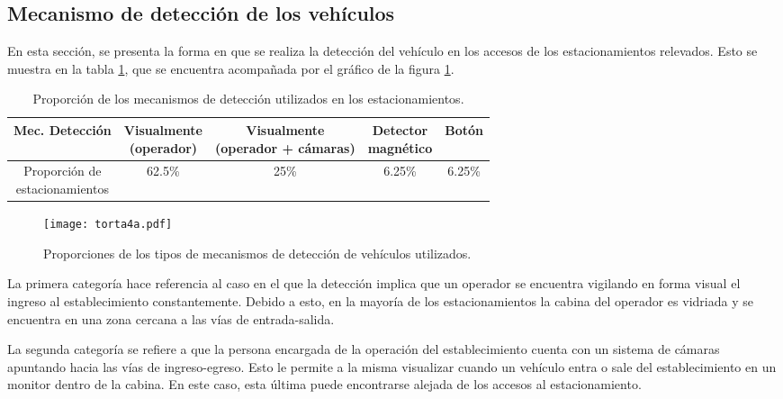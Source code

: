 \subsection{Mecanismo de detección de los vehículos}
En esta sección, se presenta la forma en que se realiza la detección del vehículo en los accesos de los estacionamientos relevados. Esto se muestra en la tabla \ref{tabla:est_dec_det}, que se encuentra acompañada por el gráfico de la figura \ref{fig:img_torta4a}.

\begin{table}[h]
	\begin{center}
		\resizebox{14cm}{!} {
			\begin{tabular}{|c|c|c|c|c|} 
				\hline
				Mec. Detección & \parbox{3cm}{\centering Visualmente \\ (operador)} & \parbox{4cm}{\centering Visualmente \\
					(operador + cámaras)}
				& \parbox{3cm}{\centering Detector \\ magnético} & Botón\\
				\hline \hline
				\parbox{3cm}{\centering Proporción de \\ estacionamientos} & 62.5\% & 25\% & 6.25\% & 6.25\%\\ \hline
			\end{tabular}
		}
		\caption{Proporción de los mecanismos de detección utilizados en los estacionamientos.}
		\label{tabla:est_dec_det}
	\end{center}
\end{table}

\begin{figure}[htb]
	\centering
	\texttt{[image: torta4a.pdf]}
	\caption{Proporciones de los tipos de mecanismos de detección de vehículos utilizados.}
	\label{fig:img_torta4a}
\end{figure}

La primera categoría hace referencia al caso en el que la detección implica que un operador se encuentra vigilando en forma visual el ingreso al establecimiento constantemente. Debido a esto, en la mayoría de los estacionamientos la cabina del operador es vidriada y se encuentra en una zona cercana a las vías de entrada-salida.

La segunda categoría se refiere a que la persona encargada de la operación del establecimiento cuenta con un sistema de cámaras apuntando hacia las vías de ingreso-egreso. Esto le permite a la misma visualizar cuando un vehículo entra o sale del establecimiento en un monitor dentro de la cabina. En este caso, esta última puede encontrarse alejada de los accesos al estacionamiento. 

